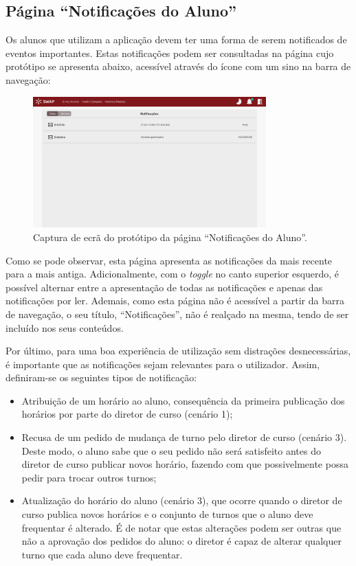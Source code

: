 \documentclass[12pt, a4paper]{article}
\begin{document}
\subsection{Página ``Notificações do Aluno''}

Os alunos que utilizam a aplicação devem ter uma forma de serem notificados de eventos importantes.
Estas notificações podem ser consultadas na página cujo protótipo se apresenta abaixo, acessível
através do ícone com um sino na barra de navegação:

\begin{figure}[H]
    \centering
    \includegraphics[width=0.8\textwidth]{res/prototype/notificacoes-aluno.png}
    \caption{Captura de ecrã do protótipo da página ``Notificações do Aluno''.}
    \label{notificacoes-aluno}
\end{figure}

Como se pode observar, esta página apresenta as notificações da mais recente para a mais antiga.
Adicionalmente, com o \emph{toggle} no canto superior esquerdo, é possível alternar entre a
apresentação de todas as notificações e apenas das notificações por ler. Ademais, como esta página
não é acessível a partir da barra de navegação, o seu título, ``Notificações'', não é realçado na
mesma, tendo de ser incluído nos seus conteúdos.

Por último, para uma boa experiência de utilização sem distrações desnecessárias, é importante que
as notificações sejam relevantes para o utilizador. Assim, definiram-se os seguintes tipos de
notificação:

\begin{itemize}
    \item Atribuição de um horário ao aluno, consequência da primeira publicação dos horários por
        parte do diretor de curso (cenário 1);
    \item Recusa de um pedido de mudança de turno pelo diretor de curso (cenário 3). Deste modo, o
        aluno sabe que o seu pedido não será satisfeito antes do diretor de curso publicar novos
        horário, fazendo com que possivelmente possa pedir para trocar outros turnos;
    \item Atualização do horário do aluno (cenário 3), que ocorre quando o diretor de curso publica
        novos horários e o conjunto de turnos que o aluno deve frequentar é alterado. É de notar que
        estas alterações podem ser outras que não a aprovação dos pedidos do aluno: o diretor é
        capaz de alterar qualquer turno que cada aluno deve frequentar.
\end{itemize}
\end{document}
